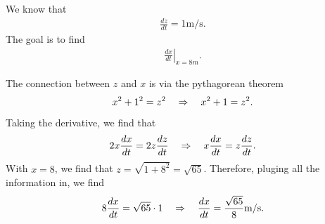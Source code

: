 	We know that 
		\begin{align*}
		\frac{dz}{dt} = 1 \textrm{m}/\textrm{s} .
		\end{align*}
	The goal is to find
		\begin{align*}
		\left. \frac{dx}{dt} \right|_{x = 8m} .
		\end{align*}
		
	The connection between $z$ and $x$ is via the pythagorean theorem
		\begin{align*}
		x^2 + 1^2 = z^2 \quad \Rightarrow \quad x^2 + 1 = z^2 .
		\end{align*}
	Taking the derivative, we find that
		\begin{align*}
		2x \frac{dx}{dt} = 2 z \frac{dz}{dt} \quad \Rightarrow \quad x \frac{dx}{dt} = z \frac{dz}{dt} .
		\end{align*}
	With $x = 8$, we find that $z = \sqrt{1 + 8^2} = \sqrt{65}$. Therefore, pluging all the information in, we find
		\begin{align*}
		8 \frac{dx}{dt} = \sqrt{65} \cdot 1 \quad \Rightarrow \quad \frac{dx}{dt} = \frac{\sqrt{65}}{8} \textrm{m}/\textrm{s} .
		\end{align*}
		
	
	
